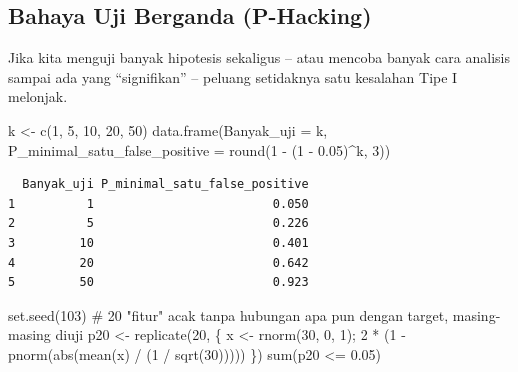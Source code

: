 \documentclass[
  indonesian,
  letterpaper,
]{book}
\newenvironment{Shaded}{\begin{snugshade}}{\end{snugshade}}
\newcommand{\AttributeTok}[1]{\textcolor[rgb]{0.40,0.45,0.13}{#1}}
\newcommand{\CommentTok}[1]{\textcolor[rgb]{0.37,0.37,0.37}{#1}}
\newcommand{\DecValTok}[1]{\textcolor[rgb]{0.68,0.00,0.00}{#1}}
\newcommand{\FloatTok}[1]{\textcolor[rgb]{0.68,0.00,0.00}{#1}}
\newcommand{\FunctionTok}[1]{\textcolor[rgb]{0.28,0.35,0.67}{#1}}
\newcommand{\NormalTok}[1]{\textcolor[rgb]{0.00,0.23,0.31}{#1}}
\newcommand{\OtherTok}[1]{\textcolor[rgb]{0.00,0.23,0.31}{#1}}
\newcommand{\SpecialCharTok}[1]{\textcolor[rgb]{0.37,0.37,0.37}{#1}}
\begin{document}
\subsection{Bahaya Uji Berganda
(P-Hacking)}\label{bahaya-uji-berganda-p-hacking}

Jika kita menguji banyak hipotesis sekaligus -- atau mencoba banyak cara
analisis sampai ada yang ``signifikan'' -- peluang setidaknya satu
kesalahan Tipe I melonjak.

\begin{Shaded}
\begin{Highlighting}[]
\NormalTok{k }\OtherTok{\textless{}{-}} \FunctionTok{c}\NormalTok{(}\DecValTok{1}\NormalTok{, }\DecValTok{5}\NormalTok{, }\DecValTok{10}\NormalTok{, }\DecValTok{20}\NormalTok{, }\DecValTok{50}\NormalTok{)}
\FunctionTok{data.frame}\NormalTok{(}\AttributeTok{Banyak\_uji =}\NormalTok{ k, }\AttributeTok{P\_minimal\_satu\_false\_positive =} \FunctionTok{round}\NormalTok{(}\DecValTok{1} \SpecialCharTok{{-}}\NormalTok{ (}\DecValTok{1} \SpecialCharTok{{-}} \FloatTok{0.05}\NormalTok{)}\SpecialCharTok{\^{}}\NormalTok{k, }\DecValTok{3}\NormalTok{))}
\end{Highlighting}
\end{Shaded}

\begin{verbatim}
  Banyak_uji P_minimal_satu_false_positive
1          1                         0.050
2          5                         0.226
3         10                         0.401
4         20                         0.642
5         50                         0.923
\end{verbatim}

\begin{Shaded}
\begin{Highlighting}[]
\FunctionTok{set.seed}\NormalTok{(}\DecValTok{103}\NormalTok{)}
\CommentTok{\# 20 "fitur" acak tanpa hubungan apa pun dengan target, masing{-}masing diuji}
\NormalTok{p20 }\OtherTok{\textless{}{-}} \FunctionTok{replicate}\NormalTok{(}\DecValTok{20}\NormalTok{, \{ x }\OtherTok{\textless{}{-}} \FunctionTok{rnorm}\NormalTok{(}\DecValTok{30}\NormalTok{, }\DecValTok{0}\NormalTok{, }\DecValTok{1}\NormalTok{); }\DecValTok{2} \SpecialCharTok{*}\NormalTok{ (}\DecValTok{1} \SpecialCharTok{{-}} \FunctionTok{pnorm}\NormalTok{(}\FunctionTok{abs}\NormalTok{(}\FunctionTok{mean}\NormalTok{(x) }\SpecialCharTok{/}\NormalTok{ (}\DecValTok{1} \SpecialCharTok{/} \FunctionTok{sqrt}\NormalTok{(}\DecValTok{30}\NormalTok{))))) \})}
\FunctionTok{sum}\NormalTok{(p20 }\SpecialCharTok{\textless{}=} \FloatTok{0.05}\NormalTok{)}
\end{Highlighting}
\end{Shaded}
\end{document}

